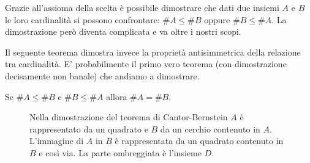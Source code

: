 Grazie all'assioma della scelta è possibile dimostrare 
che dati due insiemi $A$ e $B$ le loro cardinalità
si possono confrontare: $\#A\le \#B$ oppure 
$\#B\le \#A$. 
La dimostrazione però diventa complicata e va oltre i nostri scopi.

Il seguente teorema dimostra invece la proprietà antisimmetrica 
della relazione tra cardinalità. 
E' probabilmente il primo vero teorema 
(con dimostrazione decisamente non banale) 
che andiamo a dimostrare.

\begin{theorem}%
  \label{th:cantor_bernstein}%
  Se $\#A \le \#B$ e $\#B \le \#A$ allora $\#A = \#B$.
\end{theorem}
%
\begin{figure}
  \centering
  \caption{
  Nella dimostrazione del teorema di Cantor-Bernstein
  $A$ è rappresentato da un quadrato e $B$ da un cerchio contenuto
  in $A$. L'immagine di $A$ in $B$ è rappresentata da un quadrato contenuto
  in $B$ e così via. La parte ombreggiata è l'insieme $D$.
  }
  \label{fig:omotetia}
\end{figure}
%
